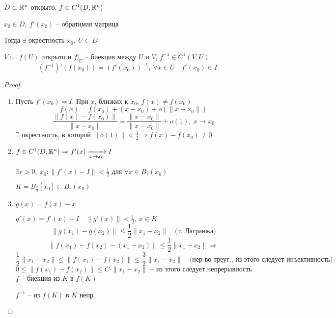     \begin{theorem}
        $D \subset \mathbb{R}^n$ открыто, $f \in C^1(D, \mathbb{R}^n)$
        \par $x_0 \in D, \ f'(x_0)$ -- обратимая матрица
        \par Тогда $\exists$ окрестность $x_0, \> U \subset D$
        \par $V := f(U)$ открыто и $f\big|_U$ -- биекция между $U$ и $V$, $f^{-1} \in C^1(V, U)$
        \[
            (f^{-1})'(f(x_0)) = (f'(x_0))^{-1}, \ \forall x \in U \quad f'(x_0) \in I    
        \]
    \end{theorem}

    \begin{proof}
        $ $ \par
        \begin{enumerate}
            \item Пусть $f'(x_0) = I$. При $x$, близких к $x_0$, $f(x) \not= f(x_0)$
                \[
                    f(x) = f(x_0) + (x-x_0) + o(\|x-x_0\|)    
                \]
                \[
                    \frac{\|f(x)-f(x_0)\|}{\| x-x_0 \|} = \frac{\|x-x_0\|}{\|x-x_0\|} + o(1), \ x \rightarrow x_0  
                \]
                $\exists$ окрестность, в которой $\|o(1)\| < \frac12 \Rightarrow f(x)-f(x_0) \not= 0$
            \item $f \in C^1(D, \mathbb{R}^n) \Rightarrow f'(x) \xrightarrow[x \rightarrow x_0]{} I$
                \par $\exists r > 0, \ x_0 : \|f'(x) - I\| < \frac12$ для $\forall x \in B_r(x_0)$
                \par $K = B_{\frac{r}{2}}[x_0] \subset B_r(x_0)$
            \item $g(x) = f(x) - x$
                \par $g'(x) = f'(x) - I \quad \|g'(x)\| < \frac12, \ x \in K$
                \[
                    \|g(x_1) - g(x_2)\| \le \frac12 \|x_1-x_2\| \quad \text{(т. Лагранжа)}
                \]
                \[
                    \|f(x_1) - f(x_2) - (x_1 - x_2)\| 
                    \le \frac12 \|x_1 - x_2\| \Rightarrow 
                \]
                \[
                    \frac12 \|x_1 - x_2\| \le \|f(x_1) - f(x_2)\| 
                    \le \frac32 \|x_1 - x_2\| \quad \text{(нер-во треуг., из этого следует инъективность)}   
                \]
                \[
                    0 \le \|f(x_1) - f(x_2)\| \le C \cdot \|x_1 - x_2\| - \text{из этого следует непрерывность} 
                \]
                $f$ -- биекция из $K$ в $f(K)$
                \par $f^{-1}$ -- из $f(K)$ в $K$ непр.

\end{enumerate}
\end{proof}
